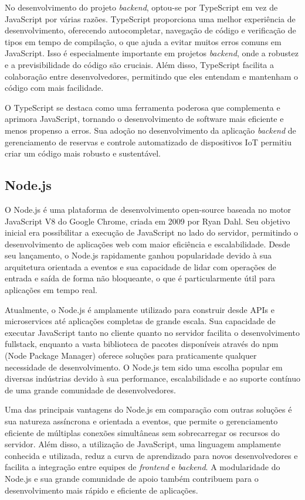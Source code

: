 No desenvolvimento do projeto \textit{backend}, optou-se por TypeScript em vez de JavaScript por várias razões. TypeScript proporciona uma melhor experiência de desenvolvimento, oferecendo autocompletar, navegação de código e verificação de tipos em tempo de compilação, o que ajuda a evitar muitos erros comuns em JavaScript. Isso é especialmente importante em projetos \textit{backend}, onde a robustez e a previsibilidade do código são cruciais. Além disso, TypeScript facilita a colaboração entre desenvolvedores, permitindo que eles entendam e mantenham o código com mais facilidade.

O TypeScript se destaca como uma ferramenta poderosa que complementa e aprimora JavaScript, tornando o desenvolvimento de software mais eficiente e menos propenso a erros. Sua adoção no desenvolvimento da aplicação \textit{backend} de gerenciamento de reservas e controle automatizado de dispositivos IoT permitiu criar um código mais robusto e sustentável.

\subsection{Node.js}

O Node.js é uma plataforma de desenvolvimento open-source baseada no motor JavaScript V8 do Google Chrome, criada em 2009 por Ryan Dahl. Seu objetivo inicial era possibilitar a execução de JavaScript no lado do servidor, permitindo o desenvolvimento de aplicações web com maior eficiência e escalabilidade. Desde seu lançamento, o Node.js rapidamente ganhou popularidade devido à sua arquitetura orientada a eventos e sua capacidade de lidar com operações de entrada e saída de forma não bloqueante, o que é particularmente útil para aplicações em tempo real.

Atualmente, o Node.js é amplamente utilizado para construir desde APIs e microservices até aplicações completas de grande escala. Sua capacidade de executar JavaScript tanto no cliente quanto no servidor facilita o desenvolvimento fullstack, enquanto a vasta biblioteca de pacotes disponíveis através do npm (Node Package Manager) oferece soluções para praticamente qualquer necessidade de desenvolvimento. O Node.js tem sido uma escolha popular em diversas indústrias devido à sua performance, escalabilidade e ao suporte contínuo de uma grande comunidade de desenvolvedores.

Uma das principais vantagens do Node.js em comparação com outras soluções é sua natureza assíncrona e orientada a eventos, que permite o gerenciamento eficiente de múltiplas conexões simultâneas sem sobrecarregar os recursos do servidor. Além disso, a utilização de JavaScript, uma linguagem amplamente conhecida e utilizada, reduz a curva de aprendizado para novos desenvolvedores e facilita a integração entre equipes de \textit{frontend} e \textit{backend}. A modularidade do Node.js e sua grande comunidade de apoio também contribuem para o desenvolvimento mais rápido e eficiente de aplicações.

